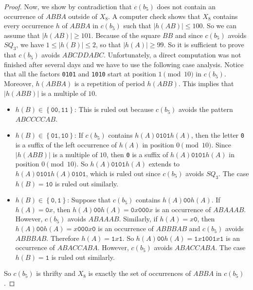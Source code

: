 \documentclass{article}
\def\acc#1{\left\{ #1 \right\}}
\renewcommand{\le}{\leqslant}
\renewcommand{\ge}{\geqslant}
\theoremstyle{plain}
\theoremstyle{definition}
\theoremstyle{remark}
\begin{document}
\begin{proof}
Now, we show by contradiction that $c(b_5)$ does not contain an occurrence of $ABBA$ outside of $X_8$.
A computer check shows that $X_8$ contains every occurrence $h$ of $ABBA$ in $c(b_5)$ such that $|h(AB)|\le100$.
So we can assume that $|h(AB)|\ge101$.
Because of the square $BB$ and since $c(b_5)$ avoids $SQ_3$, we have $1\le|h(B)|\le2$, so that $|h(A)|\ge99$.
So it is sufficient to prove that $c(b_5)$ avoids $ABCDDABC$.
Unfortunately, a direct computation was not finished after several days and we have to use the following case analysis.
Notice that all the factors \texttt{0101} and \texttt{1010} start at position $1\pmod{10}$ in $c(b_5)$. 
Moreover, $h(ABBA)$ is a repetition of period $h(ABB)$.
This implies that $|h(ABB)|$ is a multiple of $10$.
\begin{itemize}
\item $h(B)\in\acc{\texttt{00},\texttt{11}}$: This is ruled out because $c(b_5)$ avoids the pattern $ABCCCCAB$.
\item $h(B)\in\acc{\texttt{01},\texttt{10}}$: If $c(b_5)$ contains $h(A)\texttt{0101}h(A)$, then the letter \texttt{0}
is a suffix of the left occurrence of $h(A)$ in position $0\pmod{10}$. Since $|h(ABB)|$ is a multiple of $10$,
then \texttt{0} is a suffix of $h(A)\texttt{0101}h(A)$ in position $0\pmod{10}$.
So $h(A)\texttt{0101}h(A)$ extends to $h(A)\texttt{0101}h(A)\texttt{0101}$, which is ruled out since $c(b_5)$ avoids $SQ_3$. 
The case $h(B)=\texttt{10}$ is ruled out similarly.
\item $h(B)\in\acc{\texttt{0},\texttt{1}}$: Suppose that $c(b_5)$ contains $h(A)\texttt{00}h(A)$.
If $h(A)=\texttt{0}x$, then $h(A)\texttt{00}h(A)=\texttt{0}x\texttt{000}x$ is an occurrence of $ABAAAB$.
However, $c(b_5)$ avoids $ABAAAB$.
Similarly, if $h(A)=x\texttt{0}$, then $h(A)\texttt{00}h(A)=x\texttt{000}x\texttt{0}$ is an occurrence of $ABBBAB$ and $c(b_5)$ avoids $ABBBAB$.
Therefore $h(A)=\texttt{1}x\texttt{1}$. So $h(A)\texttt{00}h(A)=\texttt{1}x\texttt{1001}x\texttt{1}$
is an occurrence of $ABACCABA$. However, $c(b_5)$ avoids $ABACCABA$.
The case $h(B)=\texttt{1}$ is ruled out similarly.
\end{itemize}
So $c(b_5)$ is thrifty and $X_8$ is exactly the set of occurrences of $ABBA$ in $c(b_5)$.


\end{proof}
\end{document}
